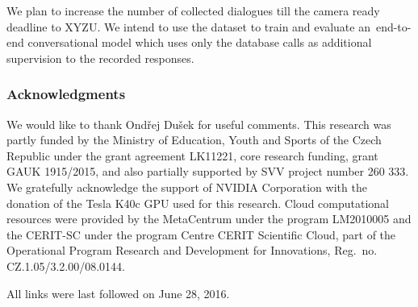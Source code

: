 \documentclass[runningheads,a4paper]{llncs}
\newcommand{\commentontext}[2]{\colorbox{yellow!60}{#1}\pdfcomment[color={0.234 0.867 0.211},hoffset=-6pt,voffset=10pt,opacity=0.5]{#2}}
\begin{document}
We plan to increase the number of collected dialogues till the camera ready deadline to XYZU.
We intend to use the dataset to train and evaluate an~end-to-end conversational model which uses only the database calls as additional supervision to the recorded responses. 

\subsubsection*{Acknowledgments}
We would like to thank Ond\v{r}ej Du\v{s}ek for useful comments.
This research was partly funded by the Ministry of Education, Youth and Sports of the Czech Republic under the grant agreement LK11221, core research funding, grant GAUK 1915/2015, and also partially supported by SVV project number 260 333. 
We gratefully acknowledge the support of NVIDIA Corporation with the donation of the Tesla K40c GPU used for this research.
Cloud computational resources were provided by the MetaCentrum under the program LM2010005 and the CERIT-SC under the program Centre CERIT Scientific Cloud, part of the Operational Program Research and Development for Innovations, Reg.\ no. CZ.1.05/3.2.00/08.0144.

%
%
%
%
%
%





All links were last followed on June 28, 2016.
\end{document}

